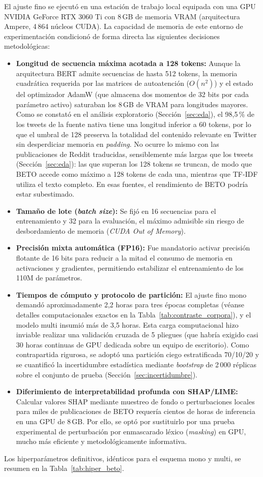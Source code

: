 \documentclass[12pt,a4paper]{article}
\begin{document}
El ajuste fino se ejecutó en una estación de trabajo local equipada con una GPU NVIDIA GeForce RTX 3060 Ti con 8\,GB de memoria VRAM (arquitectura Ampere, 4\,864 núcleos CUDA). La capacidad de memoria de este entorno de experimentación condicionó de forma directa las siguientes decisiones metodológicas:
\begin{itemize}[leftmargin=2em]
    \item \textbf{Longitud de secuencia máxima acotada a 128 tokens:} Aunque la arquitectura BERT admite secuencias de hasta 512 tokens, la memoria cuadrática requerida por las matrices de autoatención ($O(n^2)$) y el estado del optimizador AdamW (que almacena dos momentos de 32 bits por cada parámetro activo) saturaban los 8\,GB de VRAM para longitudes mayores. Como se constató en el análisis exploratorio (Sección~\ref{sec:eda}), el 98{,}5\,\% de los tweets de la fuente nativa tiene una longitud inferior a 60 tokens, por lo que el umbral de 128 preserva la totalidad del contenido relevante en Twitter sin desperdiciar memoria en \emph{padding}. No ocurre lo mismo con las publicaciones de Reddit traducidas, sensiblemente más largas que los tweets (Sección~\ref{sec:eda}): las que superan los 128 tokens se truncan, de modo que BETO accede como máximo a 128 tokens de cada una, mientras que TF-IDF utiliza el texto completo. En esas fuentes, el rendimiento de BETO podría estar subestimado.
    \item \textbf{Tamaño de lote (\emph{batch size}):} Se fijó en 16 secuencias para el entrenamiento y 32 para la evaluación, el máximo admisible sin riesgo de desbordamiento de memoria (\emph{CUDA Out of Memory}).
    \item \textbf{Precisión mixta automática (FP16):} Fue mandatorio activar precisión flotante de 16 bits para reducir a la mitad el consumo de memoria en activaciones y gradientes, permitiendo estabilizar el entrenamiento de los 110M de parámetros.
    \item \textbf{Tiempos de cómputo y protocolo de partición:} El ajuste fino mono demandó aproximadamente 2{,}2 horas para tres épocas completas (véanse detalles computacionales exactos en la Tabla~\ref{tab:contraste_corpora}), y el modelo multi insumió más de 3{,}5 horas. Esta carga computacional hizo inviable realizar una validación cruzada de 5 pliegues (que habría exigido casi 30 horas continuas de GPU dedicada sobre un equipo de escritorio). Como contrapartida rigurosa, se adoptó una partición ciego estratificada 70/10/20 y se cuantificó la incertidumbre estadística mediante \emph{bootstrap} de 2\,000 réplicas sobre el conjunto de prueba (Sección~\ref{sec:incertidumbre}).
    \item \textbf{Diferimiento de interpretabilidad profunda con SHAP/LIME:} Calcular valores SHAP mediante muestreo de fondo o perturbaciones locales para miles de publicaciones de BETO requería cientos de horas de inferencia en una GPU de 8\,GB. Por ello, se optó por sustituirlo por una prueba experimental de perturbación por enmascarado léxico (\emph{masking}) en GPU, mucho más eficiente y metodológicamente informativa.
\end{itemize}
Los hiperparámetros definitivos, idénticos para el esquema mono y multi, se resumen en la Tabla~\ref{tab:hiper_beto}.
\end{document}
